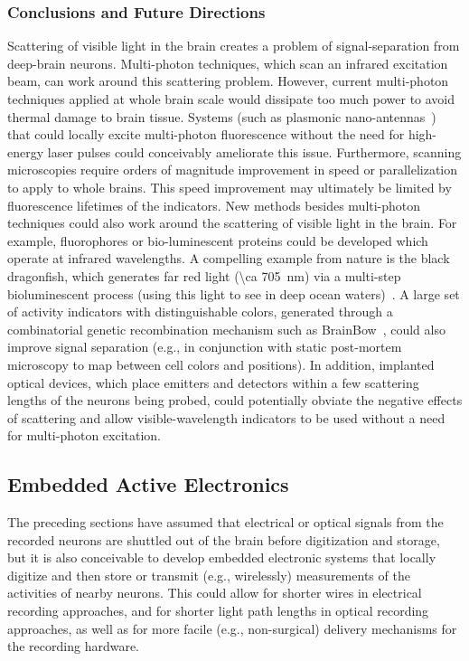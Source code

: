 \subsubsection{Conclusions and Future Directions}

Scattering of visible light in the brain creates a problem of signal-separation from deep-brain neurons.
Multi-photon techniques, which scan an infrared excitation beam, can work around this scattering problem.
However, current multi-photon techniques applied at whole brain scale would dissipate too much power to avoid thermal damage to brain tissue.
Systems (such as plasmonic nano-antennas~\cite{blanchard11}) that could locally excite multi-photon fluorescence without the need for high-energy laser pulses could conceivably ameliorate this issue.
Furthermore, scanning microscopies require orders of magnitude improvement in speed or parallelization to apply to whole brains.
This speed improvement may ultimately be limited by fluorescence lifetimes of the indicators.
New methods besides multi-photon techniques could also work around the scattering of visible light in the brain.
For example, fluorophores or bio-luminescent proteins could be developed which operate at infrared wavelengths.
A compelling example from nature is the black dragonfish, which generates far red light (\SI{\ca 705}{\nano\meter}) via a multi-step bioluminescent process (using this light to see in deep ocean waters)~\cite{widder84,campbell87}.
A large set of activity indicators with distinguishable colors, generated through a combinatorial genetic recombination mechanism such as BrainBow~\cite{livet07}, could also improve signal separation (e.g., in conjunction with static post-mortem microscopy to map between cell colors and positions).
In addition, implanted optical devices, which place emitters and detectors within a few scattering lengths of the neurons being probed, could potentially obviate the negative effects of scattering and allow visible-wavelength indicators to be used without a need for multi-photon excitation.

\subsection{Embedded Active Electronics}

The preceding sections have assumed that electrical or optical signals from the recorded neurons are shuttled out of the brain before digitization and storage, but it is also conceivable to develop embedded electronic systems that locally digitize and then store or transmit (e.g., wirelessly) measurements of the activities of nearby neurons.
This could allow for shorter wires in electrical recording approaches, and for shorter light path lengths in optical recording approaches, as well as for more facile (e.g., non-surgical) delivery mechanisms for the recording hardware.

